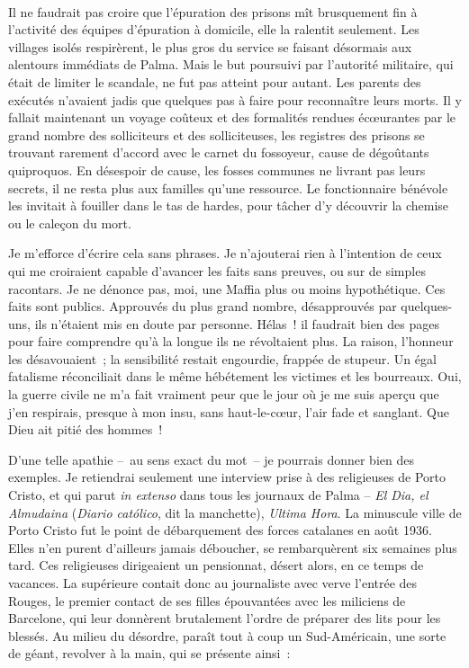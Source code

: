 \documentclass[french,twoside]{book} %
\begin{document}
\noindent  \par
Il ne faudrait pas croire que l’épuration des prisons mît brusquement fin à l’activité des équipes d’épuration à domicile, elle la ralentit seulement. Les villages isolés respirèrent, le plus gros du service se faisant désormais aux alentours immédiats de Palma. Mais le but poursuivi par l’autorité militaire, qui était de limiter le scandale, ne fut pas atteint pour autant. Les parents des exécutés n’avaient jadis que quelques pas à faire pour reconnaître leurs morts. Il y fallait maintenant un voyage coûteux et des formalités rendues écœurantes par le grand nombre des solliciteurs et des solliciteuses, les registres des prisons se trouvant rarement d’accord avec le carnet du fossoyeur, cause de dégoûtants quiproquos. En désespoir de cause, les fosses communes ne livrant pas leurs secrets, il ne resta plus aux familles qu’une ressource. Le fonctionnaire bénévole les invitait à fouiller dans le tas de hardes, pour tâcher d’y découvrir la chemise ou le caleçon du mort.\par
Je m’efforce d’écrire cela sans phrases. Je n’ajouterai rien à l’intention de ceux qui me croiraient capable d’avancer les faits sans preuves, ou sur de simples racontars. Je ne dénonce pas, moi, une Maffia plus ou moins hypothétique. Ces faits sont publics. Approuvés du plus grand nombre, désapprouvés par quelques-uns, ils n’étaient mis en doute par personne. Hélas ! il faudrait bien des pages pour faire comprendre qu’à la longue ils ne révoltaient plus. La raison, l’honneur les désavouaient ; la sensibilité restait engourdie, frappée de stupeur. Un égal fatalisme réconciliait dans le même hébétement les victimes et les bourreaux. Oui, la guerre civile ne m’a fait vraiment peur que le jour où je me suis aperçu que j’en respirais, presque à mon insu, sans haut-le-cœur, l’air fade et sanglant. Que Dieu ait pitié des hommes !\par
D’une telle apathie – au sens exact du mot – je pourrais donner bien des exemples. Je retiendrai seulement une interview prise à des religieuses de Porto Cristo, et qui parut \emph{in extenso} dans tous les journaux de Palma – \emph{El Dia, el Almudaina} (\emph{Diario católico}, dit la manchette), \emph{Ultima Hora}. La minuscule ville de Porto Cristo fut le point de débarquement des forces catalanes en août 1936. Elles n’en purent d’ailleurs jamais déboucher, se rembarquèrent six semaines plus tard. Ces religieuses dirigeaient un pensionnat, désert alors, en ce temps de vacances. La supérieure contait donc au journaliste avec verve l’entrée des Rouges, le premier contact de ses filles épouvantées avec les miliciens de Barcelone, qui leur donnèrent brutalement l’ordre de préparer des lits pour les blessés. Au milieu du désordre, paraît tout à coup un Sud-Américain, une sorte de géant, revolver à la main, qui se présente ainsi :\par
\end{document}
